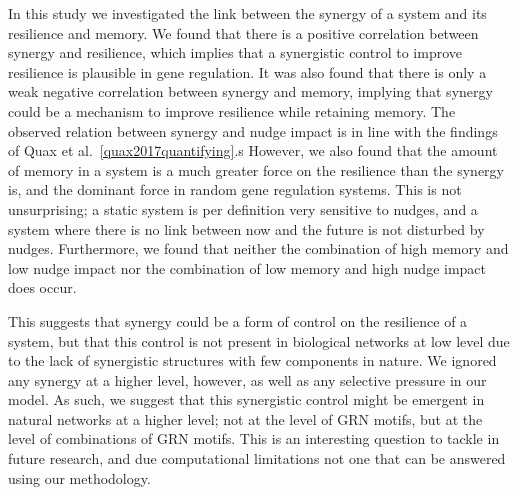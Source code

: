 \documentclass[../main.tex]{subfiles}
\begin{document}

In this study we investigated the link between the synergy of a system and its resilience and memory.
We found that there is a positive correlation between synergy and resilience, which implies that a synergistic control to improve resilience is plausible in gene regulation.
It was also found that there is only a weak negative correlation between synergy and memory, implying that synergy could be a mechanism to improve resilience while retaining memory.
The observed relation between synergy and nudge impact is in line with the findings of Quax et al.~\ref{quax2017quantifying}.s
However, we also found that the amount of memory in a system is a much greater force on the resilience than the synergy is, and the dominant force in random gene regulation systems.
This is not unsurprising; a static system is per definition very sensitive to nudges, and a system where there is no link between now and the future is not disturbed by nudges.
Furthermore, we found that neither the combination of high memory and low nudge impact nor the combination of low memory and high nudge impact does occur.

This suggests that synergy could be a form of control on the resilience of a system, but that this control is not present in biological networks at low level due to the lack of synergistic structures with few components in nature.
We ignored any synergy at a higher level, however, as well as any selective pressure in our model.
As such, we suggest that this synergistic control might be emergent in natural networks at a higher level; not at the level of GRN motifs, but at the level of combinations of GRN motifs.
This is an interesting question to tackle in future research, and due computational limitations not one that can be answered using our methodology.
\end{document}
